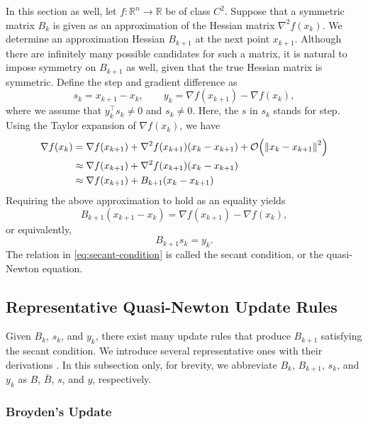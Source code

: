 \documentclass[0_en]{subfiles}
\begin{document}
In this section as well, let $f\colon \mathbb{R}^n \to \mathbb{R}$ be of class $C^2$.
Suppose that a symmetric matrix $B_k$ is given as an approximation of the Hessian matrix $\nabla^2 f(x_k)$.
We determine an approximation Hessian $B_{k+1}$ at the next point $x_{k+1}$.
Although there are infinitely many possible candidates for such a matrix, it is natural to impose symmetry on $B_{k+1}$ as well, given that the true Hessian matrix is symmetric.
Define the step and gradient difference as
\begin{equation*}
    s_k = x_{k+1} - x_k, \qquad   y_k = \nabla f(x_{k+1}) - \nabla f(x_k),
\end{equation*}
where we assume that $y_k^\top s_k \neq 0$ and $s_k \neq 0$. Here, the $s$ in $s_k$ stands for step.
Using the Taylor expansion of $\nabla f(x_k)$, we have
\begin{align*}
    \nabla f(x_k) & = \nabla f(x_{k+1}) + \nabla^2 f(x_{k+1})(x_k - x_{k+1}) + \order{\norm{x_k - x_{k+1}}^2} \\
                  & \approx \nabla f(x_{k+1}) + \nabla^2 f(x_{k+1})(x_k - x_{k+1})                            \\
                  & \approx \nabla f(x_{k+1}) + B_{k+1}(x_k - x_{k+1})
\end{align*}
Requiring the above approximation to hold as an equality yields
\begin{equation*}
    B_{k+1}(x_{k+1} - x_k) = \nabla f(x_{k+1}) - \nabla f(x_k),
\end{equation*}
or equivalently,
\begin{equation}\label{eq:secant-condition}
    B_{k+1} s_k = y_k.
\end{equation}
The relation in \cref{eq:secant-condition} is called the secant condition, or the quasi-Newton equation.

\subsection{Representative Quasi-Newton Update Rules}

Given $B_k$, $s_k$, and $y_k$, there exist many update rules that produce $B_{k+1}$ satisfying the secant condition. We introduce several representative ones with their derivations \citep{dennisjr.QuasiNewtonMethodsMotivation1977a}.
In this subsection only, for brevity, we abbreviate $B_k$, $B_{k+1}$, $s_k$, and $y_k$ as $B$, $\bar{B}$, $s$, and $y$, respectively.

\subsubsection{Broyden's Update}
\end{document}

